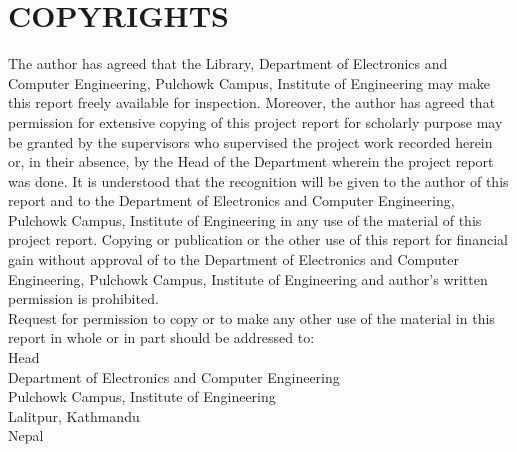 \newpage
\section*{COPYRIGHTS}

The author has agreed that the Library, Department of Electronics and Computer Engineering, Pulchowk Campus, Institute of Engineering
may make this report freely available for inspection. Moreover, the author has agreed that permission for extensive copying of this project
report for scholarly purpose may be granted by the supervisors who supervised the project work recorded herein or, in their absence, by the
Head of the Department wherein the project report was done. It is understood that the recognition will be given to the author of this report
and to the Department of Electronics and Computer Engineering, Pulchowk Campus, Institute of Engineering in any use of the material of this
project report. Copying or publication or the other use of this report for financial gain without approval of to the Department of Electronics
and Computer Engineering, Pulchowk Campus, Institute of Engineering and author’s written permission is prohibited.\\
Request for permission to copy or to make any other use of the material in this report in whole or in part should be addressed to:\\
Head\\
Department of Electronics and Computer Engineering\\
Pulchowk Campus, Institute of Engineering\\
Lalitpur, Kathmandu\\
Nepal\\

